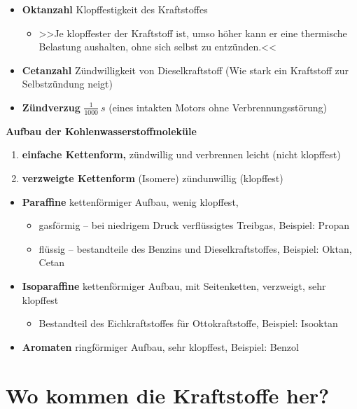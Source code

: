\begin{itemize}
\item
  \textbf{Oktanzahl} Klopffestigkeit des Kraftstoffes

  \begin{itemize}
  \item
    >>Je klopffester der Kraftstoff ist, umso höher kann er eine
    thermische Belastung aushalten, ohne sich selbst zu entzünden.<<
  \end{itemize}
\item
  \textbf{Cetanzahl} Zündwilligkeit von Dieselkraftstoff (Wie stark ein
  Kraftstoff zur Selbstzündung neigt)
\item
  \textbf{Zündverzug} $\frac{1}{1000}~s$ (eines intakten Motors ohne
  Verbrennungsstörung)
\end{itemize}

\textbf{Aufbau der Kohlenwasserstoffmoleküle}

\begin{enumerate}
\item
  \textbf{einfache Kettenform,} zündwillig und verbrennen leicht (nicht
  klopffest)
\item
  \textbf{verzweigte Kettenform} (Isomere) zündunwillig (klopffest)
\end{enumerate}

\begin{itemize}
\item
  \textbf{Paraffine} kettenförmiger Aufbau, wenig klopffest,

  \begin{itemize}
  \item
    gasförmig -- bei niedrigem Druck verflüssigtes Treibgas, Beispiel:
    Propan
  \item
    flüssig -- bestandteile des Benzins und Dieselkraftstoffes,
    Beispiel: Oktan, Cetan
  \end{itemize}
\item
  \textbf{Isoparaffine} kettenförmiger Aufbau, mit Seitenketten,
  verzweigt, sehr klopffest

  \begin{itemize}
  \item
    Bestandteil des Eichkraftstoffes für Ottokraftstoffe, Beispiel:
    Isooktan
  \end{itemize}
\item
  \textbf{Aromaten} ringförmiger Aufbau, sehr klopffest, Beispiel:
  Benzol
\end{itemize}

\section{Wo kommen die Kraftstoffe
her?}\label{wo-kommen-die-kraftstoffe-her}

